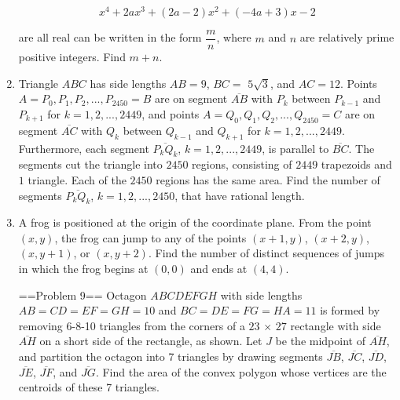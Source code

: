 \documentclass{article}
\begin{document}
\begin{enumerate}[label=\arabic*., itemsep=0.5em]
\begin{equation*}
x^4 + 2ax^3 + (2a - 2)x^2 + (-4a + 3)x - 2
\end{equation*}


are all real can be written in the form \(\dfrac{m}{n}\), where \(m\) and \(n\) are relatively prime positive integers. Find \(m + n\).\par \vspace{0.5em}\item Triangle \(ABC\) has side lengths \(AB = 9\), \(BC =\) \(5\sqrt{3}\), and \(AC = 12\). Points \(A = P_{0}, P_{1}, P_{2}, ... , P_{2450} = B\) are on segment \(\overline{AB}\) with \(P_{k}\) between \(P_{k-1}\) and \(P_{k+1}\) for \(k = 1, 2, ..., 2449\), and points \(A = Q_{0}, Q_{1}, Q_{2}, ... , Q_{2450} = C\) are on segment \(\overline{AC}\) with \(Q_{k}\) between \(Q_{k-1}\) and \(Q_{k+1}\) for \(k = 1, 2, ..., 2449\). Furthermore, each segment \(\overline{P_{k}Q_{k}}\), \(k = 1, 2, ..., 2449\), is parallel to \(\overline{BC}\). The segments cut the triangle into \(2450\) regions, consisting of \(2449\) trapezoids and \(1\) triangle. Each of the \(2450\) regions has the same area. Find the number of segments \(\overline{P_{k}Q_{k}}\), \(k = 1, 2, ..., 2450\), that have rational length.\par \vspace{0.5em}\item A frog is positioned at the origin of the coordinate plane. From the point \((x, y)\), the frog can jump to any of the points \((x + 1, y)\), \((x + 2, y)\), \((x, y + 1)\), or \((x, y + 2)\). Find the number of distinct sequences of jumps in which the frog begins at \((0, 0)\) and ends at \((4, 4)\).



==Problem 9== 
Octagon \(ABCDEFGH\) with side lengths \(AB = CD = EF = GH = 10\) and \(BC = DE = FG = HA = 11\) is formed by removing 6-8-10 triangles from the corners of a \(23\) \(\times\) \(27\) rectangle with side \(\overline{AH}\) on a short side of the rectangle, as shown. Let \(J\) be the midpoint of \(\overline{AH}\), and partition the octagon into 7 triangles by drawing segments \(\overline{JB}\), \(\overline{JC}\), \(\overline{JD}\), \(\overline{JE}\), \(\overline{JF}\), and \(\overline{JG}\). Find the area of the convex polygon whose vertices are the centroids of these 7 triangles.



\end{enumerate}
\end{document}
